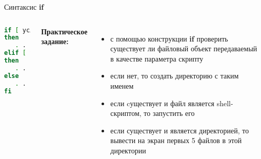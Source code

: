 \begin{frame}[fragile]{Синтаксис {\bf if}}

	\begin{columns}
	
	\begin{lstlisting}[language=bash]
if [ условие1 ]
then
   . . .
elif [ условие2 ]
then
   . . .
else
   . . .
fi
\end{lstlisting}
	{\bf Практическое задание:} \\
	\begin{itemize}

		\item с помощью конструкции {\bf if} проверить существует ли файловый объект передаваемый в качестве параметра скрипту
		\item если нет, то создать директорию с таким именем
		\item если cуществует и файл является shell-скриптом, то запустить его
		\item если существует и является директорией, то вывести на экран первых 5 файлов в этой директории
	\end{itemize}
	\end{columns}
\end{frame}




